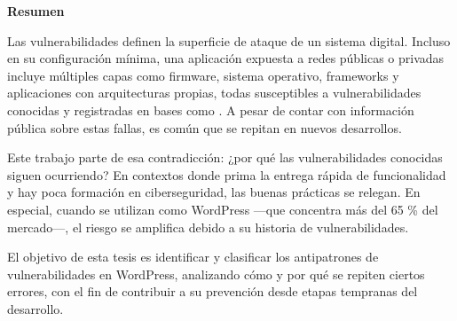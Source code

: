 \begin{center}
\textbf{Resumen}
\end{center}

\vspace{2em}
Las vulnerabilidades definen la superficie de ataque de un sistema digital. Incluso en su configuración mínima, una aplicación expuesta a redes públicas o privadas incluye múltiples capas como firmware, sistema operativo, frameworks y aplicaciones con arquitecturas propias, todas susceptibles a vulnerabilidades conocidas y registradas en bases como  \cite{CVE}. A pesar de contar con información pública sobre estas fallas, es común que se repitan en nuevos desarrollos.

Este trabajo parte de esa contradicción: ¿por qué las vulnerabilidades conocidas siguen ocurriendo? En contextos donde prima la entrega rápida de funcionalidad y hay poca formación en ciberseguridad, las buenas prácticas se relegan. En especial, cuando se utilizan  como WordPress \cite{IONOS_CMS} —que concentra más del 65 \% del mercado—, el riesgo se amplifica debido a su historia de vulnerabilidades.

El objetivo de esta tesis es identificar y clasificar los antipatrones de vulnerabilidades \cite{Nafees_2019} en WordPress, analizando cómo y por qué se repiten ciertos errores, con el fin de contribuir a su prevención desde etapas tempranas del desarrollo.
